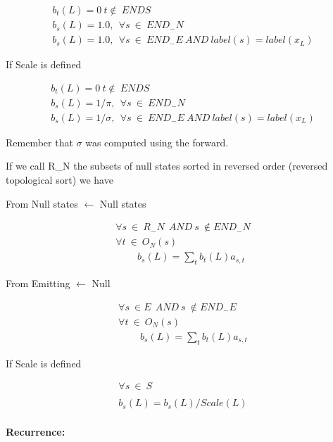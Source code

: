 \documentclass[11pt,english]{article}
\begin{document}
\[
\begin{array}{c}
b_{t}(L)=0\: t\notin \: ENDS\\
b_{s}(L)=1.0,\: \: \forall s\: \in \: END_{-}N\: \: \\
b_{s}(L)=1.0,\: \: \forall s\: \in \: END_{-}E\: AND\: label(s)=label(x_{L})
\end{array}\]

If Scale is defined 

\[
\begin{array}{c}
b_{t}(L)=0\: t\notin \: ENDS\\
b_{s}(L)=1/\pi ,\: \: \forall s\: \in \: END_{-}N\: \: \\
b_{s}(L)=1/\sigma ,\: \: \forall s\: \in \: END_{-}E\: AND\: label(s)=label(x_{L})
\end{array}\]


Remember that \( \sigma  \) was computed using the forward.

If we call R\_N the subsets of null states sorted in reversed order
(reversed topological sort) we have

From Null states \( \leftarrow  \) Null states

\[
\begin{array}{c}
\forall s\: \in \: R_{-}N\: \: AND\: s\: \notin END_{-}N\\
\forall t\: \in \: O_{N}(s)\: \\
\: \: \: \: \: \: \: \: \: \: b_{s}(L)=\sum _{t}b_{t}(L)a_{s,t}
\end{array}\]

From Emitting \( \leftarrow  \) Null

\[
\begin{array}{c}
\forall s\: \in E\: \: AND\: s\: \notin END_{-}E\\
\forall t\: \in \: O_{N}(s)\: \\
\: \: \: \: \: \: \: \: \: \: b_{s}(L)=\sum _{t}b_{t}(L)a_{s,t}
\end{array}\]

If Scale is defined 

\[
\begin{array}{c}
\forall s\: \in \: S\: \: \: \: \: \: \: \: \: \: \: \: \: \: \: \\
\\
b_{s}(L)=b_{s}(L)/Scale(L)
\end{array}\]


\paragraph{Recurrence:}
\end{document}
